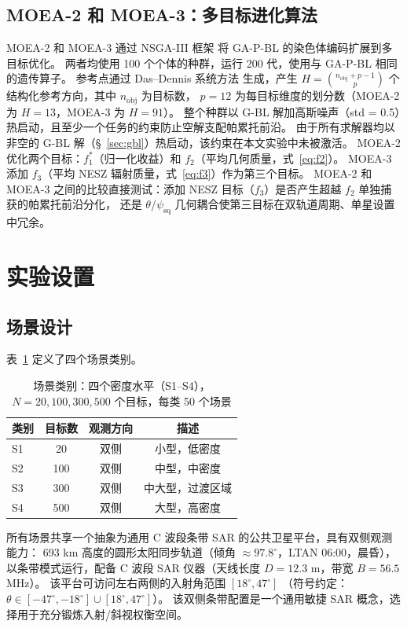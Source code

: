 \documentclass[preprint,12pt,authoryear]{elsarticle}
\begin{document}
\subsection{MOEA-2 和 MOEA-3：多目标进化算法}
\label{sec:moea-description}
MOEA-2 和 MOEA-3 通过 NSGA-III 框架 \citep{Deb2014} 将 GA-P-BL 的染色体编码扩展到多目标优化。
两者均使用 100 个个体的种群，运行 200 代，使用与 GA-P-BL 相同的遗传算子。
参考点通过 Das--Dennis 系统方法 \citep{DasDennis1998} 生成，产生
$H = \binom{n_{\text{obj}} + p - 1}{p}$ 个结构化参考方向，其中 $n_{\text{obj}}$ 为目标数，
$p = 12$ 为每目标维度的划分数（MOEA-2 为 $H = 13$，MOEA-3 为 $H = 91$）。
整个种群以 G-BL 解加高斯噪声（std = 0.5）热启动，且至少一个任务的约束防止空解支配帕累托前沿。
由于所有求解器均以非空的 G-BL 解（\S~\ref{sec:gbl}）热启动，该约束在本文实验中未被激活。
MOEA-2 优化两个目标：$f_1^*$（归一化收益）和 $f_2$（平均几何质量，式~\ref{eq:f2}）。
MOEA-3 添加 $f_3$（平均 NESZ 辐射质量，式~\ref{eq:f3}）作为第三个目标。
MOEA-2 和 MOEA-3 之间的比较直接测试：添加 NESZ 目标（$f_3$）是否产生超越 $f_2$ 单独捕获的帕累托前沿分化，
还是 $\theta$/$\psi_{\text{sq}}$ 几何耦合使第三目标在双轨道周期、单星设置中冗余。
\section{实验设置}
\subsection{场景设计}
表~\ref{tab:scenarios} 定义了四个场景类别。
\begin{table}[H]
\centering
\caption{场景类别：四个密度水平（S1--S4），$N = 20, 100, 300, 500$ 个目标，每类 50 个场景}
\label{tab:scenarios}
\begin{tabular}{lccc}
\toprule
\textbf{类别} & \textbf{目标数} & \textbf{观测方向} & \textbf{描述} \\
\midrule
S1 & 20  & 双侧 & 小型，低密度 \\
S2 & 100  & 双侧 & 中型，中密度 \\
S3 & 300 & 双侧 & 中大型，过渡区域 \\
S4 & 500 & 双侧 & 大型，高密度 \\
\bottomrule
\end{tabular}
\end{table}
所有场景共享一个抽象为通用 C 波段条带 SAR 的公共卫星平台，具有双侧观测能力：
693 km 高度的圆形太阳同步轨道（倾角 $\approx 97.8^\circ$，LTAN 06:00，晨昏），
以条带模式运行，配备 C 波段 SAR 仪器（天线长度 $D = 12.3$ m，带宽 $B = 56.5$ MHz）。
该平台可访问左右两侧的入射角范围 $[18^\circ, 47^\circ]$
（符号约定：$\theta \in [-47^\circ, -18^\circ] \cup [18^\circ, 47^\circ]$）。
该双侧条带配置是一个通用敏捷 SAR 概念，选择用于充分锻炼入射/斜视权衡空间。
\end{document}
